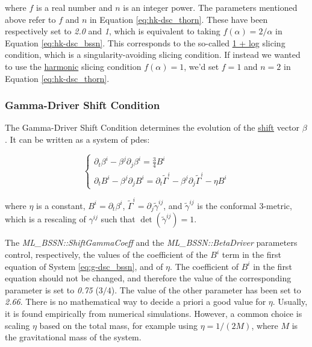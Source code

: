 \documentclass[11pt, a4paper]{article}
\begin{document}
\noindent
where \(f\) is a real number and \(n\) is an integer power. The parameters mentioned above refer to \(f\) and \(n\) in Equation \ref{eq:hk-dsc_thorn}. These have been respectively set to \textit{2.0} and \textit{1}, which is equivalent to taking \(f(\alpha) = 2 / \alpha\) in Equation \ref{eq:hk-dsc_bssn}. This corresponds to the so-called \underline{1 + log} slicing condition, which is a singularity-avoiding slicing condition. If instead we wanted to use the \underline{harmonic} slicing condition \(f(\alpha) = 1\), we'd set \(f = 1\) and \(n = 2\) in Equation \ref{eq:hk-dsc_thorn}.

\subsubsection{Gamma-Driver Shift Condition}

The Gamma-Driver Shift Condition determines the evolution of the \underline{shift} vector \(\beta\). It can be written as a system of \acrshort{pdes}:

\begin{equation} \label{eq:g-dsc_bssn}
    \begin{cases}
        \partial_t \beta^i - \beta^j \partial_j \beta^i = \frac{3}{4} B^i\\
        \partial_t B^i - \beta^j \partial_j B^i = \partial_t \tilde{\Gamma}^i - \beta^j \partial_j \tilde{\Gamma}^i - \eta B^i
    \end{cases}
\end{equation}

\noindent
where \(\eta\) is a constant, \(B^i = \partial_t \beta^i\), \(\tilde{\Gamma}^i = \partial_j \tilde{\gamma}^{ij}\), and \(\tilde{\gamma}^{ij}\) is the conformal 3-metric, which is a rescaling of \(\gamma^{ij}\) such that \(\det(\tilde{\gamma}^{ij}) = 1\).

The \textit{ML\_BSSN::ShiftGammaCoeff} and the \textit{ML\_BSSN::BetaDriver} parameters control, respectively, the values of the coefficient of the \(B^i\) term in the first equation of System \ref{eq:g-dsc_bssn}, and of \(\eta\). The coefficient of \(B^i\) in the first equation should not be changed, and therefore the value of the corresponding parameter is set to \textit{0.75} (\(3 / 4\)). The value of the other parameter has been set to \textit{2.66}. There is no mathematical way to decide a priori a good value for \(\eta\). Usually, it is found empirically from numerical simulations. However, a common choice is scaling \(\eta\) based on the total mass, for example using \(\eta = 1 / (2 M)\), where \(M\) is the gravitational mass of the system.
\end{document}
